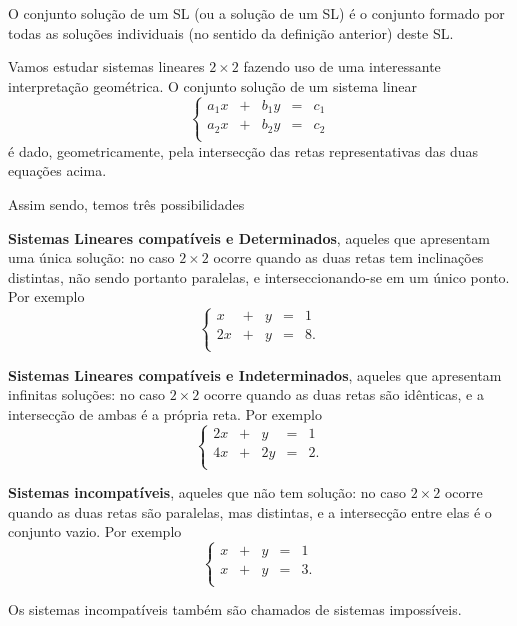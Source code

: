 \bigskip

\begin{defn}  O conjunto solução de um SL (ou a solução de um SL) é o conjunto formado por todas as soluções individuais (no sentido da definição anterior) deste SL.
\end{defn}

\begin{ex} Vamos estudar sistemas lineares $2 \times 2$ fazendo uso de uma interessante interpretação geométrica.
O conjunto solução de um sistema linear
\begin{equation*}
\left\{
\begin{array}{ccccc}
a_1 x&+&b_1 y&=&c_1 \\
a_2 x&+&b_2 y&=&c_2 \\
\end{array}
\right.
\end{equation*}
é dado, geometricamente, pela intersecção das retas representativas das duas equações acima.

Assim sendo, temos três possibilidades

{\bf Sistemas Lineares compatíveis e Determinados}, aqueles que apresentam uma única solução: no caso $2 \times 2$ ocorre quando as duas retas tem inclinações distintas, não sendo portanto paralelas, e interseccionando-se em um único ponto. Por exemplo
\begin{equation*}
\left\{
\begin{array}{ccccc}
x&+& y&=&1 \\
2 x&+& y&=&8. \\
\end{array}
\right.
\end{equation*}

{\bf Sistemas Lineares compatíveis e Indeterminados}, aqueles que apresentam infinitas soluções: no caso $2 \times 2$ ocorre quando as duas retas são idênticas, e a intersecção de ambas é a própria reta.
Por exemplo
\begin{equation*}
\left\{
\begin{array}{ccccc}
2 x&+& y&=&1 \\
4 x&+& 2 y&=& 2. \\
\end{array}
\right.
\end{equation*}

{\bf Sistemas incompatíveis}, aqueles que não tem solução: no caso $2 \times 2$ ocorre quando as duas retas são paralelas, mas distintas, e a intersecção entre elas é o conjunto vazio.
Por exemplo
\begin{equation*}
\left\{
\begin{array}{ccccc}
x&+& y&=&1 \\
x&+& y&=&3. \\
\end{array}
\right.
\end{equation*}

Os sistemas incompatíveis também são chamados de sistemas impossíveis.

\end{ex}

